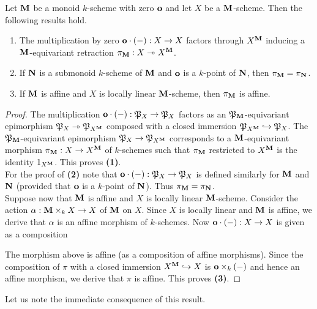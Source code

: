 \begin{proposition}\label{proposition:retraction_for_monoids_with_zero}
Let $\mathbf{M}$ be a monoid $k$-scheme with zero $\mathbf{o}$ and let $X$ be a $\mathbf{M}$-scheme. Then the following results hold.
\begin{enumerate}[label=\emph{\textbf{(\arabic*)}}, leftmargin=3.0em]
\item The multiplication by zero $\mathbf{o}\cdot(-):X\rightarrow X$ factors through $X^{\mathbf{M}}$ inducing a $\mathbf{M}$-equivariant retraction $\pi_{\mathbf{M}}:X\twoheadrightarrow X^{\mathbf{M}}$.
\item If $\mathbf{N}$ is a submonoid $k$-scheme of $\mathbf{M}$ and $\mathbf{o}$ is a $k$-point of $\mathbf{N}$, then $\pi_{\mathbf{M}} = \pi_{\mathbf{N}}$.
\item If $\mathbf{M}$ is affine and $X$ is locally linear $\mathbf{M}$-scheme, then $\pi_{\mathbf{M}}$ is affine.
\end{enumerate}
\end{proposition}
\begin{proof}
The multiplication $\mathbf{o}\cdot (-):{\mathfrak P}_X\rightarrow {\mathfrak P}_X$ factors as an ${\mathfrak P}_{\mathbf{M}}$-equivariant epimorphism ${\mathfrak P}_X\twoheadrightarrow {\mathfrak P}_{X^{\mathbf{M}}}$ composed with a closed immersion ${\mathfrak P}_{X^{\mathbf{M}}}\hookrightarrow {\mathfrak P}_X$. The ${\mathfrak P}_{\mathbf{M}}$-equivariant epimorphism ${\mathfrak P}_X\rightarrow {\mathfrak P}_{X^{\mathbf{M}}}$ corresponds to a $\mathbf{M}$-equivariant morphism $\pi_{\mathbf{M}}:X\rightarrow X^{\mathbf{M}}$ of $k$-schemes such that $\pi_{\mathbf{M}}$ restricted to $X^{\mathbf{M}}$ is the identity $1_{X^{\mathbf{M}}}$. This proves \textbf{(1)}.\\
For the proof of \textbf{(2)} note that $\mathbf{o}\cdot (-):{\mathfrak P}_X\rightarrow {\mathfrak P}_X$ is defined similarly for $\mathbf{M}$ and $\mathbf{N}$ (provided that $\mathbf{o}$ is a $k$-point of $\mathbf{N}$). Thus $\pi_{\mathbf{M}} = \pi_{\mathbf{N}}$.\\
Suppose now that $\mathbf{M}$ is affine and $X$ is locally linear $\mathbf{M}$-scheme. Consider the action $\alpha:\mathbf{M}\times_k X\rightarrow X$ of $\mathbf{M}$ on $X$. Since $X$ is locally linear and $\mathbf{M}$ is affine, we derive that $\alpha$ is an affine morphism of $k$-schemes. Now $\mathbf{o}\cdot (-):X\rightarrow X$ is given as a composition 
\begin{center}
\end{center}
The morphism above is affine (as a composition of affine morphisms). Since the composition of $\pi$ with a closed immersion $X^{\mathbf{M}}\hookrightarrow X$ is $\mathbf{o}\times_k(-)$ and hence an affine morphism, we derive that $\pi$ is affine. This proves \textbf{(3)}.
\end{proof}
\noindent
Let us note the immediate consequence of this result.


